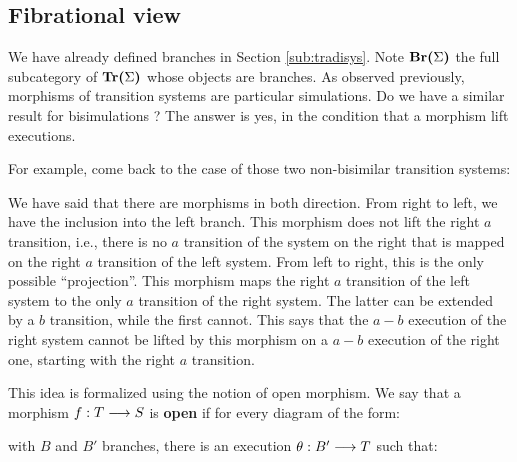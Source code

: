 		 
		 \subsection{Fibrational view}
		 \label{subsubsec:fibra}
		 
		 We have already defined branches in Section \ref{sub:tradisys}. Note $\textbf{Br(}\Sigma\textbf{)}$ the full subcategory of $\textbf{Tr(}\Sigma\textbf{)}$ whose objects are branches. As observed previously, morphisms of transition systems are particular simulations. Do we have a similar result for bisimulations ? The answer is yes, in the condition that a morphism lift executions. 
		 
		 
		 For example, come back to the case of those two non-bisimilar transition systems:
		 
		 \begin{figure}[H]
			\begin{center}
    				
  			\end{center}
		\end{figure}
		\noindent We have said that there are morphisms in both direction. From right to left, we have the inclusion into the left branch. This morphism does not lift the right $a$ transition, i.e., there is no $a$ transition of the system on the right that is mapped on the right $a$ transition of the left system. From left to right, this is the only possible ``projection''. This morphism maps the right $a$ transition of the left system to the only $a$ transition of the right system. The latter can be extended by a $b$ transition, while the first cannot. This says that the $a-b$ execution of the right system cannot be lifted by this morphism on a $a-b$ execution of the right one, starting with the right $a$ transition. 
		 
		 
		 This idea is formalized using the notion of open morphism. We say that a morphism $f : T \longrightarrow S$ is \textbf{open} if for every diagram of the form:
		 
		 \begin{figure}[H]
			\begin{center}
    				
  			\end{center}
		\end{figure}
		 
\noindent with $B$ and $B'$ branches, there is an execution $\theta : B' \longrightarrow T$ such that:
		 
		\begin{figure}[H]
			\begin{center}
    				
  			\end{center}
		\end{figure}
		 
